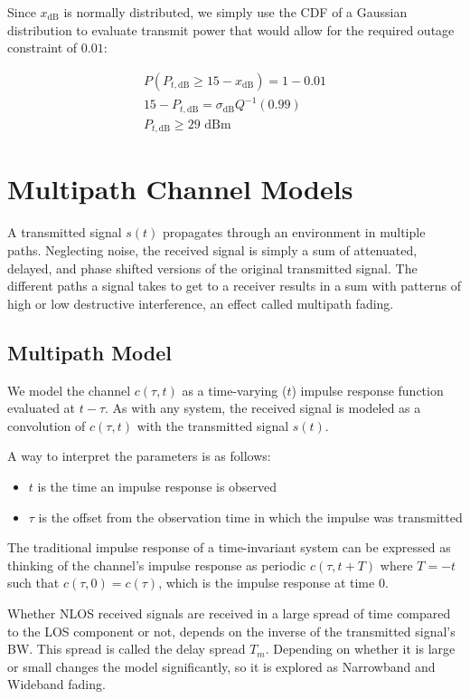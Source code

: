 \documentclass[12pt]{report} %
\begin{document}
Since $x_{\text{dB}}$ is normally distributed, we simply use the CDF of a
Gaussian distribution to evaluate transmit power that would allow for the
required outage constraint of $0.01$:

\begin{align}
  P(P_{t,\text{dB}} \geq  15 - x_{\text{dB}}) = 1 - 0.01 \nonumber \\
  15 - P_{t,\text{dB}} = \sigma_{\text{dB}}Q^{-1}(0.99) \nonumber  \\
  P_{t,\text{dB}} \geq 29 \text{ dBm} \nonumber
\end{align}

\chapter{Multipath Channel Models}
\label{multipath_ch_model}
A transmitted signal $s(t)$ propagates through an environment in multiple paths.
Neglecting noise, the received signal is simply a sum of attenuated, delayed,
and phase shifted versions of the original transmitted signal. The different
paths a signal takes to get to a receiver results in a sum with patterns of high
or low destructive interference, an effect called multipath fading.
\section{Multipath Model}
We model the channel $c(\tau,t)$ as a time-varying ($t$) impulse response function evaluated at $t - \tau$. As with any system, the received signal is modeled as a convolution of $c(\tau,t)$ with the transmitted signal $s(t)$.

A way to interpret the parameters is as follows:
\begin{itemize}
  \item $t$ is the time an impulse response is observed
  \item $\tau$ is the offset from the observation time in which the impulse was transmitted
\end{itemize}

The traditional impulse response of a time-invariant system can be expressed as
thinking of the channel's impulse response as periodic $c(\tau,t + T)$ where $T
  = -t$ such that  $c(\tau,0) = c(\tau)$, which is the impulse response at time
$0$.

Whether \gls{NLOS} received signals are received in a large spread of time
compared to the \gls{LOS} component or not, depends on the inverse of the
transmitted signal's \gls{BW}. This spread is called the delay spread $T_m$.
Depending on whether it is large or small changes the model significantly, so it
is explored as Narrowband and Wideband fading.
\end{document}
